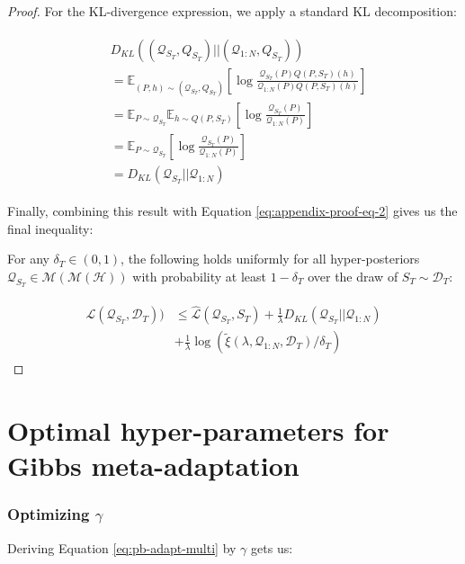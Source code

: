 \documentclass[letterpaper]{article} %
\theoremstyle{definition}
\newcommand{\Expect}[2]{\mathbb{E}_{#1}\left [#2 \right ]}
\begin{document}
\begin{proof}
	For the KL-divergence expression, we apply a standard KL decomposition:
	
	\begin{align*}
	\begin{split}
	&D_{KL}((\mathcal{Q}_{S_T}, Q_{S_T})||(\mathcal{Q}_{1:N}, Q_{S_T}))\\
	&=\Expect{(P,h)\sim (\mathcal{Q}_{S_T},Q_{S_T})}{\log\frac{\mathcal{Q}_{S_T}(P)Q(P, S_T)(h)}{\mathcal{Q}_{1:N}(P)Q(P, S_T)(h)}}\\
	&=\mathbb{E}_{P\sim \mathcal{Q}_{S_T}}\Expect{h\sim Q(P,S_T)}{\log\frac{\mathcal{Q}_{S_T}(P)}{\mathcal{Q}_{1:N}(P)}}\\
	&=\Expect{P\sim \mathcal{Q}_{S_T}}{\log\frac{\mathcal{Q}_{S_T}(P)}{\mathcal{Q}_{1:N}(P)}}\\
	&=D_{KL}(\mathcal{Q}_{S_T}||\mathcal{Q}_{1:N})
	\end{split}
	\end{align*}
	
	Finally, combining this result with Equation \ref{eq:appendix-proof-eq-2} gives us the final inequality:
	
	For any $\delta_T \in (0,1)$, the following holds uniformly for all hyper-posteriors $\mathcal{Q}_{S_T}\in \mathcal{M}(\mathcal{M}(\mathcal{H}))$ with probability at least $1-\delta_T$ over the draw of $S_T\sim \mathcal{D}_T$:
	
	\begin{align*}
	\begin{split}
	\mathcal{L}(\mathcal{Q}_{S_T}, \mathcal{D}_T)) &\leq \hat{\mathcal{L}}(\mathcal{Q}_{S_T}, S_T) + \frac{1}{\lambda}D_{KL}(\mathcal{Q}_{S_T}||\mathcal{Q}_{1:N})\\
	&+\frac{1}{\lambda}\log\left (\tilde{\xi}(\lambda,\mathcal{Q}_{1:N},\mathcal{D}_T)/\delta_T\right )
	\end{split}
	\end{align*}
	\end{proof}

\section{Optimal hyper-parameters for Gibbs meta-adaptation} \label{append:optimiziation}

\subsubsection{Optimizing $\gamma$}

Deriving Equation \ref{eq:pb-adapt-multi} by $\gamma$ gets us:
\end{document}
